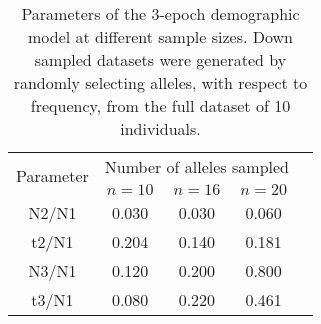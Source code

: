 \begin{table}[h!]
\centering
\caption[Parameters of the 3-epoch demographic model at different sample sizes]{Parameters of the 3-epoch demographic model at different sample sizes. Down sampled datasets were generated by randomly selecting alleles, with respect to frequency, from the full dataset of 10 individuals.}
 \begin{tabular}{c c c c c } 

\toprule
\multirow{2}{*}{Parameter} & \multicolumn{3}{c}{Number of alleles sampled} \\ 
	&	$n = 10$ & 	$n = 16$ & 	$n = 20$ \\ \hline
N2/N1 &	0.030 &	0.030 &	0.060 \\
t2/N1 &	0.204 &	0.140 &	0.181 \\
N3/N1 &	0.120 &	0.200 &	0.800 \\
t3/N1 &	0.080 &	0.220 &	0.461 \\
\bottomrule

\end{tabular}
\label{tab:C3S3}
\end{table}